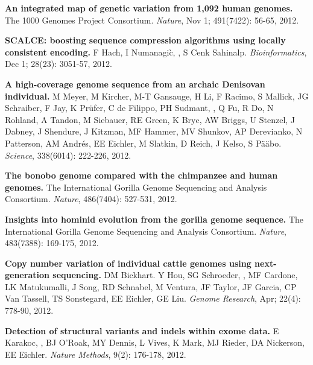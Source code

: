         
\vspace{-.2cm}
        {\bf An integrated map of genetic variation from 1,092 human genomes.}
        The 1000 Genomes Project Consortium. 
        {\em Nature}, Nov 1; 491(7422): 56-65, 2012.
        
\vspace{-.2cm}
        {\bf SCALCE: boosting sequence compression algorithms using locally consistent encoding.}
        F Hach, I Numanagi\`{c}, \calkan{}, S Cenk Sahinalp.  
        {\em Bioinformatics}, Dec 1; 28(23): 3051-57, 2012.


\vspace{-.2cm}
        {\bf A high-coverage genome sequence from an archaic Denisovan individual.}
        M Meyer, M Kircher, M-T Gansauge, H Li, F Racimo, S Mallick, JG Schraiber, F Jay, K Pr\"{u}fer, C de Filippo, PH Sudmant, 
        \calkan{}, Q Fu, R Do, N Rohland, A Tandon, M Siebauer, RE Green, 
        K Bryc, AW Briggs, U Stenzel, J Dabney, J Shendure, J Kitzman, MF Hammer, MV Shunkov, 
        AP Derevianko, N Patterson, AM Andr\'{e}s, EE Eichler, M Slatkin, D Reich, J Kelso, S P\"{a}\"{a}bo. 
        {\em Science}, 338(6014): 222-226, 2012.

\vspace{-.2cm}
        {\bf The bonobo genome compared with the chimpanzee and human genomes.}
        The International Gorilla Genome Sequencing and Analysis Consortium.
        {\em Nature}, 486(7404): 527-531, 2012.


\vspace{-.2cm}
    {\bf Insights into hominid evolution from the gorilla genome sequence.}
    The International Gorilla Genome Sequencing and Analysis Consortium.
    {\em Nature}, 483(7388): 169-175, 2012. 
    

\vspace{-.2cm}
    {\bf Copy number variation of individual cattle genomes using next-generation sequencing.} 
    DM Bickhart. Y Hou, SG Schroeder, \calkan{}, MF Cardone, LK Matukumalli, J Song, 
    RD Schnabel, M Ventura, JF Taylor, JF Garcia, CP Van Tassell, TS Sonstegard, EE Eichler, GE Liu. 
    {\em Genome Research}, Apr; 22(4): 778-90, 2012.
    
\vspace{-.2cm}
    {\bf Detection of structural variants and indels within exome data.} E Karakoc, \calkan{}, BJ O'Roak, 
    MY Dennis, L Vives, K Mark, MJ Rieder, DA Nickerson, EE Eichler. {\em Nature Methods}, 9(2): 176-178, 2012.

    \clearpage
    
